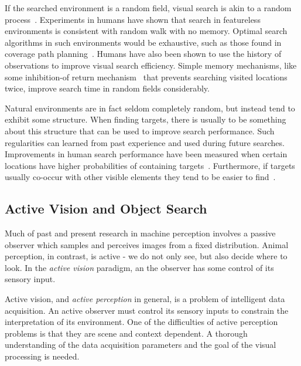 If the searched environment is a random field, visual search is akin to a random process~\cite{nakayama_situating_2011}.
Experiments in humans have shown that search in featureless environments is consistent with random walk with no memory.
Optimal search algorithms in such environments would be exhaustive, such as those found in coverage path planning~\cite{galceran_carreras_2013}.
Humans have also been shown to use the history of observations to improve visual search efficiency. 
Simple memory mechanisms, like some inhibition-of return mechanism~\cite{itti_koch_2001} that prevents searching visited locations twice, improve search time in random fields considerably.

Natural environments are in fact seldom completely random, but instead tend to exhibit some structure.
When finding targets, there is usually to be something about this structure that can be used to improve search performance.
Such regularities can learned  from past experience and used during future searches.
Improvements in human search performance have been measured when certain locations have higher probabilities of containing targets~\cite{eckstein_visual_2011,wolfe_five_2017}.
Furthermore, if targets usually co-occur with other visible elements they tend to be easier to find~\cite{eckstein_visual_2011,wolfe_five_2017}.

\subsection{Active Vision and Object Search} 
\label{sec:activevision}

Much of past and present research in machine perception involves a passive observer which samples and perceives images from a fixed distribution.
Animal perception, in contrast, is active - we do not only see, but also decide where to look.
In the \textit{active vision} paradigm, an the observer has some control of its sensory input.~\cite{aloimonos_active_1988}

Active vision, and \textit{active perception} in general, is a problem of intelligent data acquisition.
An active observer must control its sensory inputs to constrain the interpretation of its environment.
One of the difficulties of active perception problems is that they are scene and context dependent.
A thorough understanding of the data acquisition parameters and the goal of the visual processing is needed.~\cite{bajcsy_active_1988}



